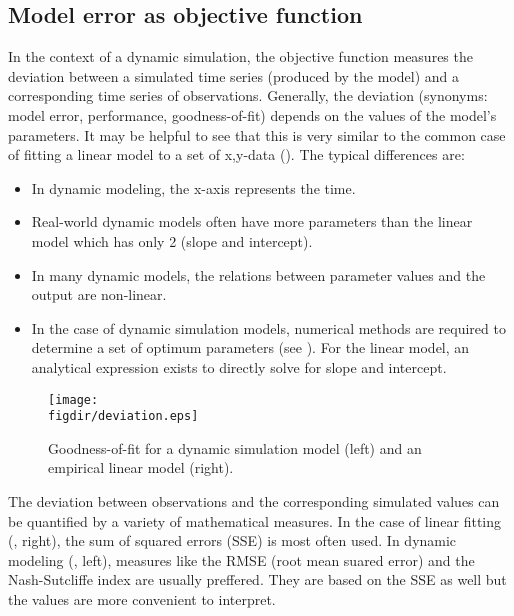 \subsection{Model error as objective function} \label{sec:mops:background:objFun}

In the context of a dynamic simulation, the objective function measures the deviation between a simulated time series (produced by the model) and a corresponding time series of observations. Generally, the deviation (synonyms: model error, performance, goodness-of-fit) depends on the values of the model's parameters. It may be helpful to see that this is very similar to the common case of fitting a linear model to a set of x,y-data (). The typical differences are:
\begin{itemize}
  \item In dynamic modeling, the x-axis represents the time.
  \item Real-world dynamic models often have more parameters than the linear model which has only 2 (slope and intercept).
  \item In many dynamic models, the relations between parameter values and the output are non-linear.
  \item In the case of dynamic simulation models, numerical methods are required to determine a set of optimum parameters (see ). For the linear model, an analytical expression exists to directly solve for slope and intercept.
\end{itemize}

\begin{figure}
  \centering
  \texttt{[image: \\figdir/deviation.eps]}
  \caption{Goodness-of-fit for a dynamic simulation model (left) and an empirical linear model (right). \label{fig:mops:concepts:optimization:deviation}}
\end{figure}

The deviation between observations and the corresponding simulated values can be quantified by a variety of mathematical measures. In the case of linear fitting (, right), the sum of squared errors (SSE) is most often used. In dynamic modeling (, left), measures like the RMSE (root mean suared error) and the Nash-Sutcliffe index are usually preffered. They are based on the SSE as well but the values are more convenient to interpret.


